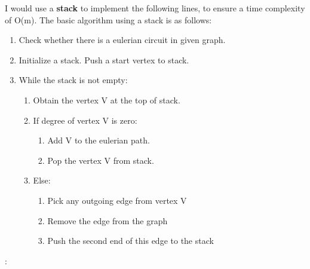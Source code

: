 \documentclass[solution,addpoints,12pt]{exam}
\begin{document}
{\begin{questions}
\begin{solution}
I would use a \textbf{stack} to implement the following lines, to ensure a time complexity of O(m). The basic algorithm using a stack is as follows:
{
\begin{enumerate}
    \item Check whether there is a eulerian circuit in given graph.
\vspace{1mm}
    \item Initialize a stack. Push a start vertex to stack.
\vspace{1mm}
    \item While the stack is not empty:
  \begin{enumerate}
    \item Obtain the vertex V at the top of stack.
    \item If degree of vertex V is zero:
  \begin{enumerate}
    \item Add V to the eulerian path.
    \item Pop the vertex V from stack.
  \end{enumerate}
    \item Else:
  \begin{enumerate}
    \item Pick any outgoing edge from vertex V
    \item Remove the edge from the graph
    \item Push the second end of this edge to the stack
  \end{enumerate}
  \end{enumerate}
\end{enumerate}}
\end{solution}


: 
\end{questions}}
\end{document}
